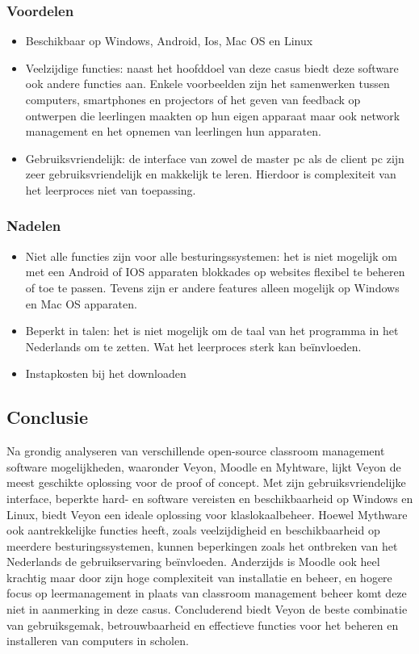 \subsubsection{Voordelen}
\begin{itemize}
    \item Beschikbaar op Windows, Android, Ios, Mac OS en Linux
    \item Veelzijdige functies: naast het hoofddoel van deze casus biedt deze software ook andere functies aan. Enkele voorbeelden zijn het samenwerken tussen computers, smartphones en projectors of het geven van feedback op ontwerpen die leerlingen maakten op hun eigen apparaat maar ook network management en het opnemen van leerlingen hun apparaten.
    \item Gebruiksvriendelijk: de interface van zowel de master pc als de client pc zijn zeer gebruiksvriendelijk en makkelijk te leren. Hierdoor is complexiteit van het leerproces niet van toepassing. 
\end{itemize}
\subsubsection{Nadelen}
\begin{itemize} 
    \item Niet alle functies zijn voor alle besturingssystemen: het is niet mogelijk om met een Android of IOS apparaten blokkades op websites flexibel te beheren of toe te passen. Tevens zijn er andere features alleen mogelijk op Windows en Mac OS apparaten.
    \item Beperkt in talen: het is niet mogelijk om de taal van het programma in het Nederlands om te zetten. Wat het leerproces sterk kan beïnvloeden.
    \item Instapkosten bij het downloaden
    \autocite{mythware}
    \end{itemize}
\subsection{Conclusie}
Na grondig analyseren van verschillende open-source classroom management software mogelijkheden, waaronder Veyon, Moodle en Myhtware, lijkt Veyon de meest geschikte oplossing voor de proof of concept. Met zijn gebruiksvriendelijke interface, beperkte hard- en software vereisten en beschikbaarheid op Windows en Linux, biedt Veyon een ideale oplossing voor klaslokaalbeheer. Hoewel Mythware ook aantrekkelijke functies heeft, zoals veelzijdigheid en beschikbaarheid op meerdere besturingssystemen, kunnen beperkingen zoals het ontbreken van het Nederlands de gebruikservaring beïnvloeden. Anderzijds is Moodle ook heel krachtig maar door zijn hoge complexiteit van installatie en beheer, en hogere focus op leermanagement in plaats van classroom management beheer komt deze niet in aanmerking in deze casus. Concluderend biedt Veyon de beste combinatie van gebruiksgemak, betrouwbaarheid en effectieve functies voor het beheren en installeren van computers in scholen.

